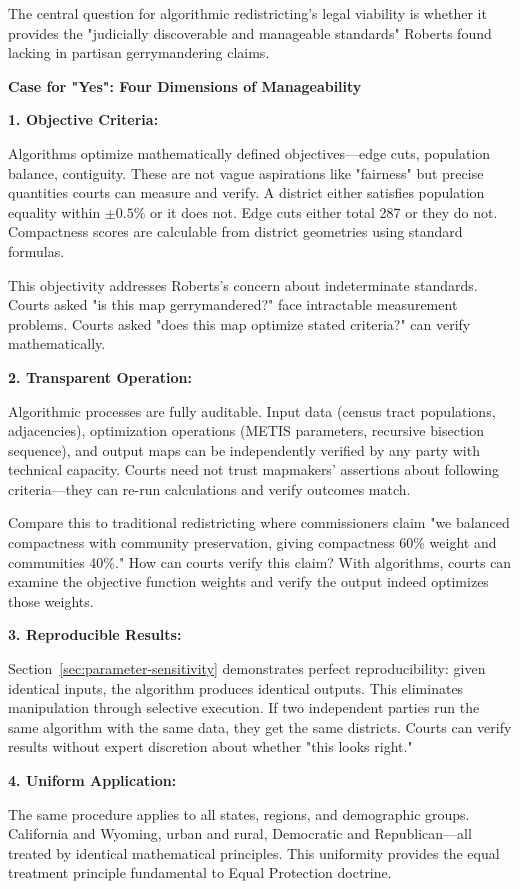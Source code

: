 The central question for algorithmic redistricting's legal viability is whether it provides the "judicially discoverable and manageable standards" Roberts found lacking in partisan gerrymandering claims.

\textbf{Case for "Yes": Four Dimensions of Manageability}

\textbf{1. Objective Criteria:}

Algorithms optimize mathematically defined objectives—edge cuts, population balance, contiguity. These are not vague aspirations like "fairness" but precise quantities courts can measure and verify. A district either satisfies population equality within $\pm 0.5\%$ or it does not. Edge cuts either total 287 or they do not. Compactness scores are calculable from district geometries using standard formulas.

This objectivity addresses Roberts's concern about indeterminate standards. Courts asked "is this map gerrymandered?" face intractable measurement problems. Courts asked "does this map optimize stated criteria?" can verify mathematically.

\textbf{2. Transparent Operation:}

Algorithmic processes are fully auditable. Input data (census tract populations, adjacencies), optimization operations (METIS parameters, recursive bisection sequence), and output maps can be independently verified by any party with technical capacity. Courts need not trust mapmakers' assertions about following criteria—they can re-run calculations and verify outcomes match.

Compare this to traditional redistricting where commissioners claim "we balanced compactness with community preservation, giving compactness 60\% weight and communities 40\%." How can courts verify this claim? With algorithms, courts can examine the objective function weights and verify the output indeed optimizes those weights.

\textbf{3. Reproducible Results:}

Section~\ref{sec:parameter-sensitivity} demonstrates perfect reproducibility: given identical inputs, the algorithm produces identical outputs. This eliminates manipulation through selective execution. If two independent parties run the same algorithm with the same data, they get the same districts. Courts can verify results without expert discretion about whether "this looks right."

\textbf{4. Uniform Application:}

The same procedure applies to all states, regions, and demographic groups. California and Wyoming, urban and rural, Democratic and Republican—all treated by identical mathematical principles. This uniformity provides the equal treatment principle fundamental to Equal Protection doctrine.

